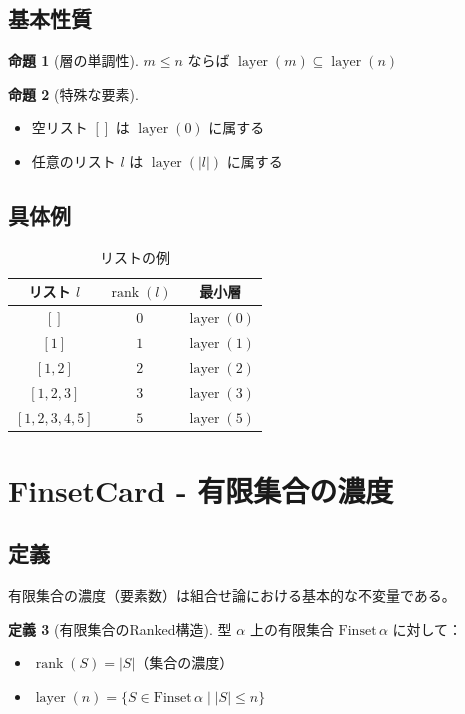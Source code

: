 \documentclass[a4paper,11pt]{ltjsarticle}
\theoremstyle{definition}
\newtheorem{definition}{定義}[section]
\newtheorem{proposition}[definition]{命題}
\newcommand{\rank}{\operatorname{rank}}
\newcommand{\layer}{\operatorname{layer}}
\begin{document}
\subsection{基本性質}

\begin{proposition}[層の単調性]
$m \leq n$ ならば $\layer(m) \subseteq \layer(n)$
\end{proposition}

\begin{proposition}[特殊な要素]
\begin{itemize}
\item 空リスト $[]$ は $\layer(0)$ に属する
\item 任意のリスト $l$ は $\layer(|l|)$ に属する
\end{itemize}
\end{proposition}

\subsection{具体例}

\begin{table}[h]
\centering
\begin{tabular}{|c|c|c|}
\hline
リスト $l$ & $\rank(l)$ & 最小層 \\
\hline
$[]$ & $0$ & $\layer(0)$ \\
$[1]$ & $1$ & $\layer(1)$ \\
$[1, 2]$ & $2$ & $\layer(2)$ \\
$[1, 2, 3]$ & $3$ & $\layer(3)$ \\
$[1, 2, 3, 4, 5]$ & $5$ & $\layer(5)$ \\
\hline
\end{tabular}
\caption{リストの例}
\label{tab:list-examples}
\end{table}

\section{FinsetCard - 有限集合の濃度}
\label{sec:finsetcard}

\subsection{定義}

有限集合の濃度（要素数）は組合せ論における基本的な不変量である。

\begin{definition}[有限集合のRanked構造]
\label{def:finset-ranked}
型 $\alpha$ 上の有限集合 $\text{Finset}\,\alpha$ に対して：
\begin{itemize}
\item $\rank(S) = |S|$（集合の濃度）
\item $\layer(n) = \{ S \in \text{Finset}\,\alpha \mid |S| \leq n \}$
\end{itemize}
\end{definition}
\end{document}
